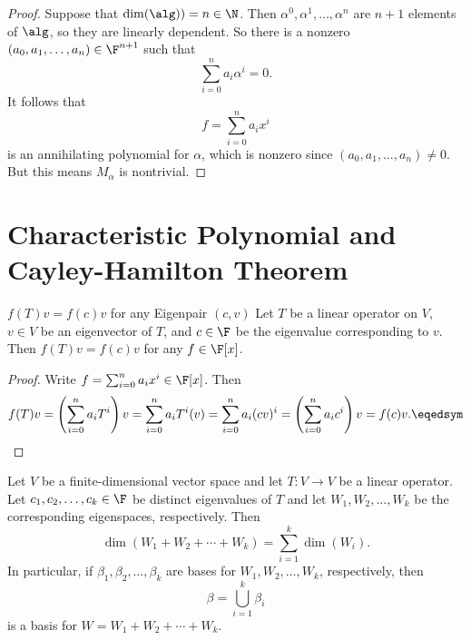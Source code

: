 \documentclass[math_245.tex]{subfiles}
\begin{document}
    \begin{proof}
        Suppose that $\dim(\alg)) = n\in \N$. Then $\alpha^0, \alpha^1, \ldots, \alpha^n$ are $n+1$ elements of $\alg$, so they are linearly dependent. So there is a nonzero $\left( a_0, a_1, \ldots, a_n \right) \in \F^{n+1}$ such that
        \begin{equation*}
            \sum^{n}_{i=0} a_i\alpha^i = 0.
        \end{equation*}
        It follows that
        \begin{equation*}
            f = \sum^{n}_{i=0} a_ix^i
        \end{equation*}
        is an annihilating polynomial for $\alpha$, which is nonzero since $\left( a_0, a_1, \ldots, a_n \right)\neq 0$. But this means $M_\alpha$ is nontrivial.
    \end{proof}

    \section{Characteristic Polynomial and Cayley-Hamilton Theorem}

    \begin{lemma}{$f(T)v = f(c)v$ for any Eigenpair $(c,v)$}
        Let $T$ be a linear operator on $V$, $v\in V$ be an eigenvector of $T$, and $c\in \F$ be the eigenvalue corresponding to $v$. Then $f(T)v = f(c)v$ for any $f\in \F[x]$.
    \end{lemma}

    \begin{proof}
        Write $f = \sum^{n}_{i=0} a_ix^i \in \F[x]$. Then
        \begin{equation*}
            f(T)v = \left( \sum^{n}_{i=0} a_iT^i \right) v = \sum^{n}_{i=0} a_iT^i(v) = \sum^{n}_{i=0} a_i(cv)^i = \left( \sum^{n}_{i=0} a_ic^i \right) v = f(c)v. \eqedsym
        \end{equation*}
    \end{proof}

    \begin{lemma}{}
        Let $V$ be a finite-dimensional vector space and let $T:V\to V$ be a linear operator. Let $c_1, c_2, \ldots, c_k\in \F$ be distinct eigenvalues of $T$ and let $W_1, W_2, \ldots, W_k$ be the corresponding eigenspaces, respectively. Then
        \begin{equation*}
            \dim \left( W_1 + W_2 + \cdots + W_k \right) = \sum^{k}_{i=1} \dim(W_i). 
        \end{equation*}
        In particular, if $\beta_1, \beta_2, \ldots, \beta_k$ are bases for $W_1, W_2, \ldots, W_k$, respectively, then
        \begin{equation*}
            \beta = \bigcup^{k}_{i=1} \beta_i
        \end{equation*}
        is a basis for $W = W_1 + W_2 + \cdots + W_k$.
    \end{lemma}
\end{document}
